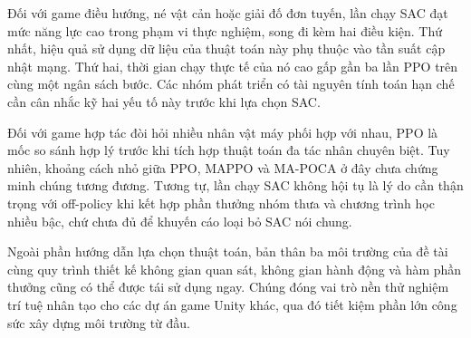 \indent Đối với game điều hướng, né vật cản hoặc giải đố đơn tuyến, lần chạy SAC đạt mức
năng lực cao trong phạm vi thực nghiệm, song đi kèm hai điều kiện. Thứ nhất, hiệu quả sử dụng
dữ liệu của thuật toán này phụ thuộc vào tần suất cập nhật mạng. Thứ hai, thời gian chạy
thực tế của nó cao gấp gần ba lần PPO trên cùng một ngân sách bước. Các nhóm phát triển có
tài nguyên tính toán hạn chế cần cân nhắc kỹ hai yếu tố này trước khi lựa chọn SAC.

\indent Đối với game hợp tác đòi hỏi nhiều nhân vật máy phối hợp với nhau, PPO là mốc so
sánh hợp lý trước khi tích hợp thuật toán đa tác nhân chuyên biệt. Tuy nhiên, khoảng cách
nhỏ giữa PPO, MAPPO và MA-POCA ở đây chưa chứng minh chúng tương đương. Tương tự, lần chạy
SAC không hội tụ là lý do cần thận trọng với off-policy khi kết hợp phần thưởng nhóm thưa
và chương trình học nhiều bậc, chứ chưa đủ để khuyến cáo loại bỏ SAC nói chung.

\indent Ngoài phần hướng dẫn lựa chọn thuật toán, bản thân ba môi trường của đề tài cùng
quy trình thiết kế không gian quan sát, không gian hành động và hàm phần thưởng cũng có
thể được tái sử dụng ngay. Chúng đóng vai trò nền thử nghiệm trí tuệ nhân tạo cho các dự
án game Unity khác, qua đó tiết kiệm phần lớn công sức xây dựng môi trường từ đầu.
